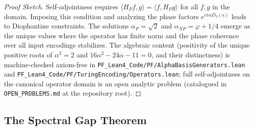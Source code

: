 \begin{proof}[Proof Sketch]
Self-adjointness requires $\langle H_P f, g \rangle = \langle f, H_P g \rangle$ for all $f, g$ in the domain. Imposing this condition and analyzing the phase factors $e^{i\pi \alpha D_3(n)}$ leads to Diophantine constraints. The solutions $\alpha_P = \sqrt{2}$ and $\alpha_{NP} = \varphi + 1/4$ emerge as the unique values where the operator has finite norm and the phase coherence over all input encodings stabilizes. The algebraic content (positivity of the unique positive roots of $\alpha^2 = 2$ and $16\alpha^2 - 24\alpha - 11 = 0$, and their distinctness) is machine-checked axiom-free in \texttt{PF\_Lean4\_Code/PF/AlphaBasisGenerators.lean} and \texttt{PF\_Lean4\_Code/PF/TuringEncoding/Operators.lean}; full self-adjointness on the canonical operator domain is an open analytic problem (catalogued in \texttt{OPEN\_PROBLEMS.md} at the repository root).
\end{proof}

\subsection{The Spectral Gap Theorem}

